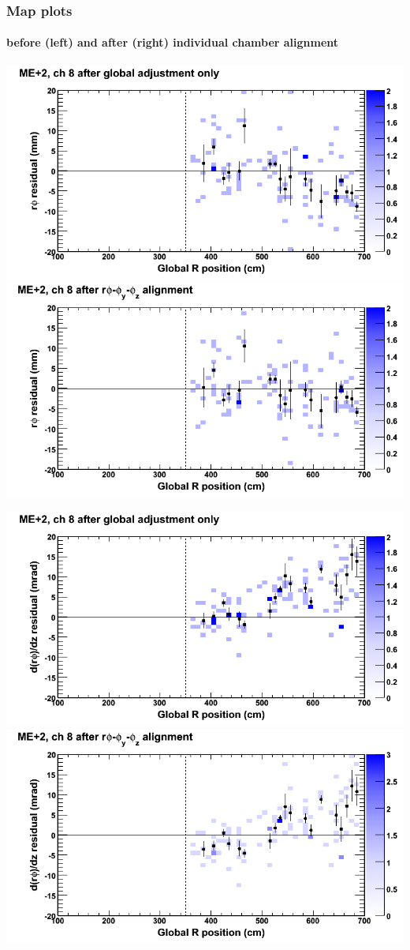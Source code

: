 \documentclass[compress]{beamer}
\begin{document}
\begin{frame}
\frametitle{Map plots}
\framesubtitle{before (left) and after (right) individual chamber alignment}
\includegraphics[width=0.5\linewidth]{ringmapplots_3dof/before_CSCvsr_mep2ch08_x.png} \includegraphics[width=0.5\linewidth]{ringmapplots_3dof/after_CSCvsr_mep2ch08_x.png}

\includegraphics[width=0.5\linewidth]{ringmapplots_3dof/before_CSCvsr_mep2ch08_dxdz.png} \includegraphics[width=0.5\linewidth]{ringmapplots_3dof/after_CSCvsr_mep2ch08_dxdz.png}
\end{frame}
\end{document}

